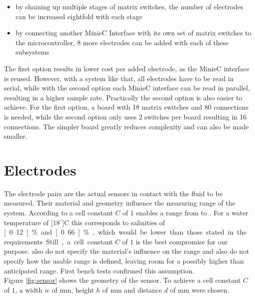 \begin{itemize}
    \item by chaining up multiple stages of matrix switches, the number of electrodes can be increased eightfold with each stage
    \item by connecting another MinieC Interface with its own set of matrix switches to the microcontroller, 8 more electrodes can be added with each of these subsystems
\end{itemize}

The first option results in lower cost per added electrode, as the MinieC interface is reused. However, with a system like that, all electrodes have to be read in serial, while with the second option each MinieC interface can be read in parallel, resulting in a higher sample rate. Practically the second option is also easier to achieve. For the first option, a board with 18 matrix switches and 80 connections is needed, while the second option only uses 2 switches per board resulting in 16 connections. The simpler board greatly reduces complexity and can also be made smaller.

\section{Electrodes}

The electrode pairs are the actual sensors in contact with the fluid to be measured. Their material and geometry influence the measuring range of the system. According to  \textcite{trankler2015sensortechnik} a cell constant $ C $ of $1$ enables a range from  to . For a water temperature of \unit[$18^\circ$]{C} this corresponds to salinities of \unit[0.12]{\%} and \unit[0.66]{\%}, which would be lower than those stated in the requirements. Still, a cell constant $ C $ of $1$ is the best compromise for our purpose. \textcite{trankler2015sensortechnik} also do not specify the material's influence on the range and also do not specify how the usable range is defined, leaving room for a possibly higher than anticipated range. First bench tests confirmed this assumption.\\

Figure \ref{fig:sensor} shows the geometry of the sensor. To achieve a cell constant $C$ of $1$, a width $w$ of \unit[1]{mm}, height $h$ of \unit[10]{mm} and distance $d$ of \unit[10]{mm} were chosen.\\

